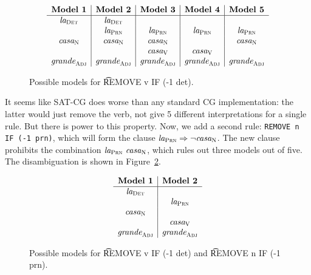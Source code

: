 \begin{figure}[h]
\centering
$$\begin{array}{ c | c | c | c | c}
\textbf{Model 1}  & \textbf{Model 2}  & \textbf{Model 3} & \textbf{Model 4} & \textbf{Model 5} \\ \hline
 \laDet   &  \laDet  &         &        &        \\
          &  \laPrn  & \laPrn  & \laPrn & \laPrn \\
 \casaN   &  \casaN  & \casaN  &        & \casaN \\
          &          & \casaV  & \casaV &         \\
\grandeAdj & \grandeAdj & \grandeAdj & \grandeAdj & \grandeAdj \\

\end{array}$$
\caption{Possible models for \t{REMOVE v IF (-1 det)}.}
\label{fig:modelsOneRule}
\end{figure}


It seems like SAT-CG does worse than any standard CG implementation:
the latter would just remove the verb, not give 5 different interpretations for a single rule.
But there is power to this property. Now, we add a second rule: \texttt{REMOVE n IF (-1 prn)}, which will form the clause $\text{\em la}_{\text{\sc Prn}} \Rightarrow \neg \text{\em casa}_{\text{\sc N}}$. The new clause
prohibits the combination $\text{\em la}_{\text{\sc Prn}} \ \text{\em casa}_{\text{\sc N}}$, which rules out three models out of five. The disambiguation is shown in Figure~\ref{fig:modelsTwoRules}.

\begin{figure}[h!]
\centering
$$\begin{array}{ c | c }
 \textbf{Model 1}  & \textbf{Model 2}  \\ \hline
 \laDet   &          \\
          &  \laPrn  \\
 \casaN   &          \\
          &  \casaV   \\
\grandeAdj & \grandeAdj \\

\end{array}$$
\caption{Possible models for \t{REMOVE v IF (-1 det)} and \t{REMOVE n IF (-1 prn)}.}
\label{fig:modelsTwoRules}
\end{figure}



